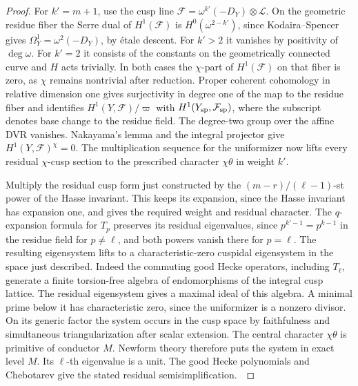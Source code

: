 \documentclass[a4paper,11pt]{article}
\theoremstyle{definition}
\theoremstyle{remark}
\numberwithin{equation}{section}
\begin{document}
\begin{proof}
For \(k'=m+1\), use the cusp line
\(\mathcal F=\omega^{k'}(-D_Y)\otimes\mathcal L\).
On the geometric residue fiber the Serre dual of \(H^1(\mathcal F)\)
is \(H^0(\omega^{2-k'})\), since Kodaira--Spencer gives
\(\Omega^1_Y=\omega^2(-D_Y)\), by étale descent.
For \(k'>2\) it vanishes by positivity of \(\deg\omega\).
For \(k'=2\) it consists of the constants on the geometrically
connected curve and \(H\) acts trivially. In both cases the
\(\chi\)-part of \(H^1(\mathcal F)\) on that fiber is zero,
as \(\chi\) remains nontrivial after reduction. Proper coherent
cohomology in relative dimension one gives surjectivity in
degree one of the map to the residue fiber and identifies
\(H^1(Y,\mathcal F)/\varpi\) with
\(H^1(Y_{\rm sp},\mathcal F_{\rm sp})\), where the subscript denotes
base change to the residue field. The degree-two group
over the affine DVR vanishes. Nakayama's lemma and the integral
projector give \(H^1(Y,\mathcal F)^\chi=0\).
The multiplication sequence for the uniformizer now lifts
every residual \(\chi\)-cusp section to the prescribed
character \(\chi\theta\) in weight \(k'\).

Multiply the residual cusp form just constructed by the
\((m-r)/(\ell-1)\)-st power of the Hasse invariant. This keeps
its expansion, since the Hasse invariant has expansion one,
and gives the required weight and residual character.
The \(q\)-expansion formula for \(T_p\) preserves its residual
eigenvalues, since \(p^{k'-1}=p^{k-1}\) in the residue field for
\(p\ne\ell\), and both powers vanish there for \(p=\ell\).
The resulting eigensystem lifts to a characteristic-zero
cuspidal eigensystem in the space just described. Indeed the
commuting good Hecke operators, including \(T_\ell\), generate
a finite torsion-free algebra of endomorphisms of the integral
cusp lattice. The residual eigensystem gives a maximal ideal
of this algebra. A minimal prime below it has characteristic
zero, since the uniformizer is a nonzero divisor. On its
generic factor the system occurs in the cusp space by
faithfulness and simultaneous triangularization after scalar
extension. The central character \(\chi\theta\) is primitive
of conductor \(M\). Newform theory therefore puts the system
in exact level \(M\). Its \(\ell\)-th eigenvalue is a unit.
The good Hecke polynomials and Chebotarev give the stated
residual semisimplification.~\cite{VII-V-V-newforms,VII-V-V-deligne,VII-V-katz361}
\end{proof}
\end{document}
